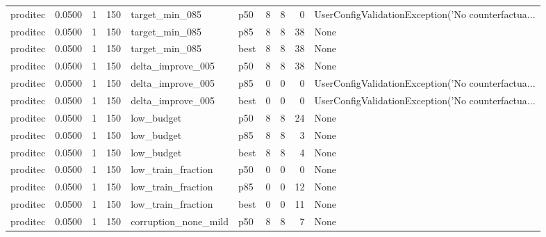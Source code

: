 \begin{tabular}{lrrrllrrrl}
proditec &    0.0500 &    1 &    150 &       target\_min\_085 &    p50 &               8 &          8 &       0 & UserConfigValidationException('No counterfactua... \\
proditec &    0.0500 &    1 &    150 &       target\_min\_085 &    p85 &               8 &          8 &      38 &                                               None \\
proditec &    0.0500 &    1 &    150 &       target\_min\_085 &   best &               8 &          8 &      38 &                                               None \\
proditec &    0.0500 &    1 &    150 &    delta\_improve\_005 &    p50 &               8 &          8 &      38 &                                               None \\
proditec &    0.0500 &    1 &    150 &    delta\_improve\_005 &    p85 &               0 &          0 &       0 & UserConfigValidationException('No counterfactua... \\
proditec &    0.0500 &    1 &    150 &    delta\_improve\_005 &   best &               0 &          0 &       0 & UserConfigValidationException('No counterfactua... \\
proditec &    0.0500 &    1 &    150 &           low\_budget &    p50 &               8 &          8 &      24 &                                               None \\
proditec &    0.0500 &    1 &    150 &           low\_budget &    p85 &               8 &          8 &       3 &                                               None \\
proditec &    0.0500 &    1 &    150 &           low\_budget &   best &               8 &          8 &       4 &                                               None \\
proditec &    0.0500 &    1 &    150 &   low\_train\_fraction &    p50 &               0 &          0 &       0 &                                               None \\
proditec &    0.0500 &    1 &    150 &   low\_train\_fraction &    p85 &               0 &          0 &      12 &                                               None \\
proditec &    0.0500 &    1 &    150 &   low\_train\_fraction &   best &               0 &          0 &      11 &                                               None \\
proditec &    0.0500 &    1 &    150 & corruption\_none\_mild &    p50 &               8 &          8 &       7 &                                               None \\

\end{tabular}
